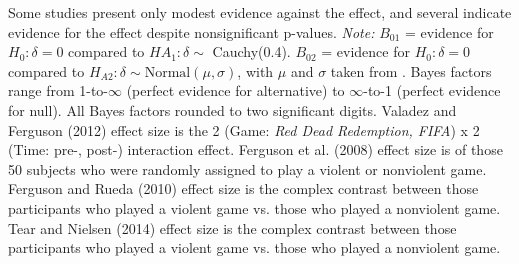 \documentclass[man]{apa6}
\begin{document}
\begin{table}
\vspace{4mm}
Some studies present only modest evidence against the effect, and several indicate evidence for the effect despite nonsignificant p-values. 
{\em Note:} $B_{01}$ = evidence for $H_0: \delta = 0$ compared to $HA_1: \delta \sim$ Cauchy(0.4). $B_{02}$ = evidence for $H_0: \delta = 0$ compared to $H_{A2}: \delta \sim \mbox{Normal}(\mu, \sigma)$, with $\mu$ and $\sigma$ taken from \citet{Anderson:etal:2010}. Bayes factors range from 1-to-$\infty$ (perfect evidence for alternative) to $\infty$-to-1 (perfect evidence for null). All Bayes factors rounded to two significant digits. Valadez and Ferguson (2012) effect size is the 2 (Game: {\em Red Dead Redemption, FIFA}) x 2 (Time: pre-, post-) interaction effect. Ferguson et al. (2008) effect size is of those 50 subjects who were randomly assigned to play a violent or nonviolent game. Ferguson and Rueda (2010) effect size is the complex contrast between those participants who played a violent game vs. those who played a nonviolent game. Tear and Nielsen (2014) effect size is the complex contrast between those participants who played a violent game vs. those who played a nonviolent game.
\label{mainStudyResults}
\end{table}
\end{document}
